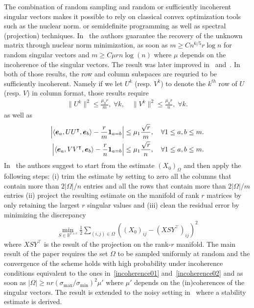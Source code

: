 \documentclass[12pt]{article}
\def\bs{\ensuremath\boldsymbol}
\begin{document}
The combination of random sampling and random or sufficiently incoherent singular vectors makes it possible to rely on classical convex optimization tools such as the nuclear norm. or semidefinite programming as well as spectral (projection) techniques. In~\cite{candes2008exact} the authors guarantee the recovery of the unknown matrix through nuclear norm minimization, as soon as $m\geq C n^{6/5}r\log n$ for random singular vectors and $m\geq C\mu rn\log(n)$ where $\mu$ depends on the incoherence of the singular vectors.  The result was later improved in~\cite{candes2010power} and~\cite{recht2011simpler}.  In both of those results, the row and column subspaces are requried to be sufficiently incoherent. Namely if we let $U^k$ (resp. $V^k$) to denote the $k^{th}$ row of $U$ (resp. $V$) in column format, those results require 
\begin{align}
\|U^k\|^2 \leq \frac{\mu_0 r}{m}, \; \forall k, \quad \|V^k\|^2 \leq \frac{\mu_0 r}{n}, \; \forall k.\label{incoherence01}
\end{align} 
as well as 
\begin{align}
\begin{split}
\left|\langle \bs e_a,  UU^\intercal, \bs e_b\rangle - \frac{r}{m} \mathbf{1}_{a=b} \right|\leq \mu_1 \frac{\sqrt{r}}{m}, \quad \forall 1\leq a, b\leq m.\\
\left|\langle \bs e_a,  VV^\intercal, \bs e_b\rangle - \frac{r}{n} \mathbf{1}_{a=b} \right|\leq \mu_1 \frac{\sqrt{r}}{n}, \quad \forall 1\leq a, b\leq m.
\end{split}\label{incoherence02}
\end{align}
In~\cite{keshavan2009matrix, keshavan2010matrix} the authors suggest to start from the estimate $(X_0)_{\Omega}$ and then apply the following steps: (i) trim the estimate by setting to zero all the columns that contain more than $2|\Omega|/n$ entries and all the rows that contain more than $2|\Omega|/m$ entries (ii) project the resulting estimate on the manifold of rank $r$ matrices by only retaining the largest $r$ singular values and (iii) clean the residual error by minimizing the discrepancy
\begin{align}
\min_{S\in \mathbb{R}^{r\times r}} \frac{1}{2}\sum_{(i,j)\in \Omega} \left((X_0)_{ij} - (XSY^\intercal)_{ij}\right)^2
\end{align}
where $XSY^\intercal$ is the result of the projection on the rank-$r$ manifold. The main result of the paper requires the set $\Omega$ to be sampled uniformly at random and the convergence of the scheme holds with high probability under incoherence conditions equivalent to the ones in~\eqref{incoherence01} and~\eqref{incoherence02} and as soon as $|\Omega|\geq nr (\sigma_{\max}/\sigma_{\min})^2 \mu'$ where $\mu'$ depends on the (in)coherences of the singular vectors. The result is extended to the noisy setting in~\cite{keshavan2010matrix} where a stability estimate is derived. 
\end{document}
